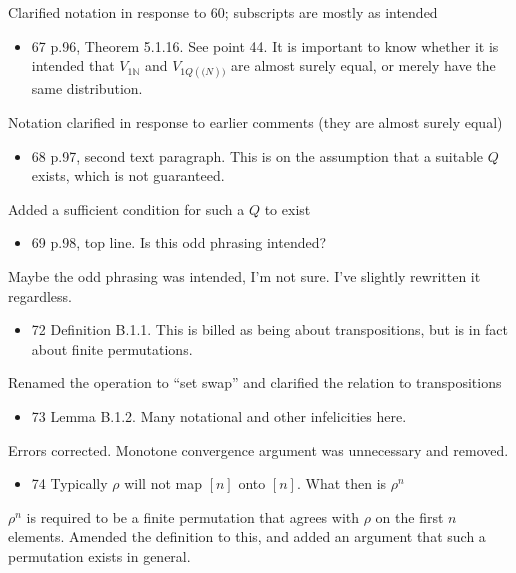 \documentclass[12pt, a4paper]{article}
\begin{document}
Clarified notation in response to 60; subscripts are mostly as intended

\begin{itemize}
    \item 67 p.96, Theorem 5.1.16. See point 44. It is important to know whether it is intended that $V_{1 \mathbb{N}}$ and $V_{1Q( \mathbb(N) )}$ are almost surely equal, or merely have the same distribution.
\end{itemize}

Notation clarified in response to earlier comments (they are almost surely equal)

\begin{itemize}
    \item 68 p.97, second text paragraph. This is on the assumption that a suitable $Q$ exists, which is not guaranteed.
\end{itemize}
 
Added a sufficient condition for such a $Q$ to exist

\begin{itemize}
    \item 69 p.98, top line. Is this odd phrasing intended?
\end{itemize}
 
Maybe the odd phrasing was intended, I'm not sure. I've slightly rewritten it regardless.

\begin{itemize}
    \item 72 Definition B.1.1. This is billed as being about transpositions,
but is in fact about finite permutations.
\end{itemize}

Renamed the operation to ``set swap'' and clarified the relation to transpositions

\begin{itemize}
    \item 73 Lemma B.1.2. Many notational and other infelicities here.
\end{itemize}
 
Errors corrected. Monotone convergence argument was unnecessary and removed.

\begin{itemize}
    \item 74 Typically $\rho$ will not map $[n]$ onto $[n]$. What then is $\rho^n$
\end{itemize}
 
$\rho^n$ is required to be a finite permutation that agrees with $\rho$ on the first $n$ elements. Amended the definition to this, and added an argument that such a permutation exists in general.
\end{document}
